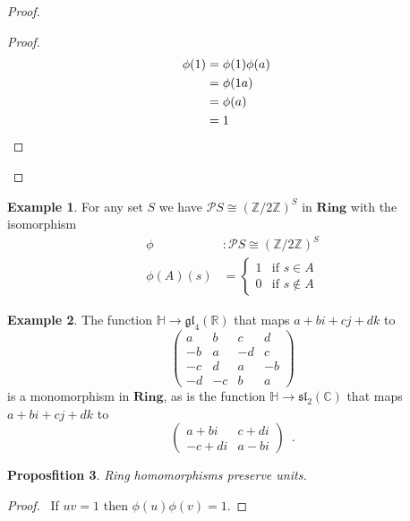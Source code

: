 \documentclass{book}
\let\qed\relax
\newtheorem{prop}{Proposfition}[chapter]
\theoremstyle{definition}
\newtheorem{ex}[prop]{Example}
\begin{document}
\begin{proof}
\pf
{}
\begin{proof}
\pf
\begin{align*}
\phi(1) & = \phi(1) \phi(a) \\
& = \phi(1a) \\
& = \phi(a) \\
& = 1 & \qed
\end{align*}
\end{proof}
\end{proof}

\begin{ex}
For any set $S$ we have $\mathcal{P} S \cong (\mathbb{Z} / 2 \mathbb{Z})^S$ in $\mathbf{Ring}$ with the isomorphism
\begin{align*}
\phi & : \mathcal{P} S \cong (\mathbb{Z} / 2 \mathbb{Z})^S \\
\phi(A)(s) & = \begin{cases}
1 & \text{if } s \in A \\
0 & \text{if } s \notin A
\end{cases}
\end{align*}
\end{ex}

\begin{ex}
The function $\mathbb{H} \rightarrow \mathfrak{gl}_4(\mathbb{R})$ that maps $a + bi + cj + dk$ to
\[ \left( \begin{array}{cccc}
a & b & c & d \\
-b & a & -d & c \\
-c & d & a & -b \\
-d & -c & b & a
\end{array} \right) \]
is a monomorphism in $\mathbf{Ring}$, as is the function $\mathbb{H} \rightarrow \mathfrak{sl}_2(\mathbb{C})$ that maps $a + bi + cj + dk$ to
\[ \left( \begin{array}{cc}
a + bi & c + di \\
-c + di & a - bi
\end{array} \right) \enspace . \]
\end{ex}

\begin{prop}
Ring homomorphisms preserve units.
\end{prop}

\begin{proof}
\pf\ If $uv = 1$ then $\phi(u) \phi(v) = 1$. \qed
\end{proof}
\end{document}
